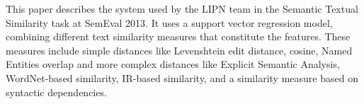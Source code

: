 This paper describes the system used by the LIPN team in the Semantic Textual Similarity task at SemEval 2013. It uses a support vector regression model,
 combining different text similarity measures that constitute the features.
 These measures include simple distances like Levenshtein edit distance, cosine,
 Named Entities overlap and more complex distances like Explicit Semantic
 Analysis, WordNet-based similarity, IR-based similarity, and a similarity
 measure based on syntactic dependencies.

